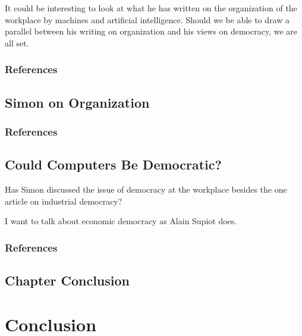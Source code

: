 \documentclass[version=last,draft=true,paper=A4,portrait,twoside=true,twocolumn=true,headinclude=false,footinclude=false,fontsize=10,BCOR=20mm,DIV=13,pagesize=auto,titlepage=false,mpinclude=false,open=right,chapterprefix=true,numbers=autoendperiod,headsepline=false,parskip=false]{scrbook}
\begin{document}
It could be interesting to look at what he has written on the organization
of the workplace by machines and artificial intelligence. Should we be able
to draw a parallel between his writing on organization and his views on
democracy, we are all set. 

\subsection*{References}
\printbibliography[heading=none,keyword=chapter-2]
\section{Simon on Organization}
\label{sec:orgac0b1a3}
\subsection*{References}
\printbibliography[heading=none,keyword=chapter-2.1]
\section{Could Computers Be Democratic?}
\label{sec:org2ba0200}
Has Simon discussed the issue of democracy at the workplace besides the one
article on industrial democracy?

I want to talk about economic democracy as Alain Supiot does.  

\subsection*{References}
\printbibliography[heading=none,keyword=chapter-2.2]
\section{Chapter Conclusion}
\label{sec:org4ed2cea}
\printbibliography[heading=none,keyword=chapter-2.3]
\chapter{Conclusion}
\label{sec:org5d79c36}
\lipsum
\end{document}
